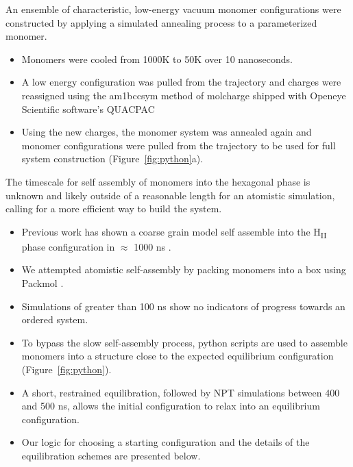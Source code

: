 \documentclass{article}
\begin{document}
  An ensemble of characteristic, low-energy vacuum monomer configurations
  were constructed by applying a simulated annealing process to a
  parameterized monomer.
  \begin{itemize}
    \item Monomers were cooled from 1000K to 50K over 10 nanoseconds.
    \item A low energy configuration was pulled from the trajectory 
    and charges were reassigned using the am1bccsym method of molcharge
    shipped with Openeye Scientific software's QUACPAC %
    \item Using the new charges, the monomer system was annealed again and monomer
    configurations were pulled from the trajectory to be used for full
    system construction (Figure~\ref{fig:python}a).
  \end{itemize}
  
  The timescale for self assembly of monomers into the hexagonal phase is
  unknown and likely outside of a reasonable length for an atomistic
  simulation, calling for a more efficient way to build the system. 
  \begin{itemize}
    \item Previous work has shown a coarse grain model self assemble into
    the H\textsubscript{II} phase configuration in $\approx$ 1000 ns \cite{mondal_self-assembly_2013}.
    \item We attempted atomistic self-assembly by packing monomers into a box 
    using Packmol \cite{martinez_packmol:_2009}.
    \item Simulations of greater than 100 ns show no indicators of progress 
    towards an ordered system.
    \item To bypass the slow self-assembly process, python scripts are used
    to assemble monomers into a structure close to the expected equilibrium 
    configuration (Figure~\ref{fig:python}).
    \item A short, restrained equilibration, followed by NPT simulations 
    between 400 and 500 ns, allows the initial configuration to relax into
    an equilibrium configuration.
    \item Our logic for choosing a starting configuration and the details 
    of the equilibration schemes are presented below.
  \end{itemize}
  
\end{document}
